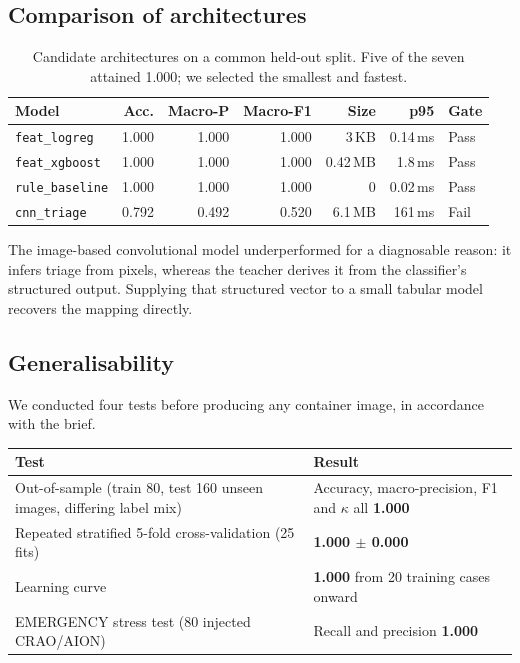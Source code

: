 \documentclass[11pt,a4paper]{article}
\newcommand{\code}[1]{\texttt{\small #1}}
\begin{document}
\subsection{Comparison of architectures}

\begin{table}[H]
\caption{Candidate architectures on a common held-out split. Five of the seven
attained 1.000; we selected the smallest and fastest.}
\begin{tabularx}{\textwidth}{@{}Yrrrrrl@{}}
\toprule
\textbf{Model} & \textbf{Acc.} & \textbf{Macro-P} & \textbf{Macro-F1} &
\textbf{Size} & \textbf{p95} & \textbf{Gate} \\
\midrule
{}
\code{feat\_logreg}   & 1.000 & 1.000 & 1.000 & 3\,KB    & 0.14\,ms & Pass \\
\code{feat\_xgboost}  & 1.000 & 1.000 & 1.000 & 0.42\,MB & 1.8\,ms  & Pass \\
\code{rule\_baseline} & 1.000 & 1.000 & 1.000 & 0        & 0.02\,ms & Pass \\
\code{cnn\_triage}    & 0.792 & \textcolor{stopRed}{0.492} &
\textcolor{stopRed}{0.520} & 6.1\,MB & 161\,ms & \textcolor{stopRed}{Fail} \\
\bottomrule
\end{tabularx}
\end{table}

The image-based convolutional model underperformed for a diagnosable reason: it
infers triage from pixels, whereas the teacher derives it from the classifier's
structured output. Supplying that structured vector to a small tabular model
recovers the mapping directly.

\subsection{Generalisability}

We conducted four tests before producing any container image, in accordance with
the brief.

\begin{table}[H]
\begin{tabularx}{\textwidth}{@{}YL{54mm}@{}}
\toprule
\textbf{Test} & \textbf{Result} \\
\midrule
Out-of-sample (train 80, test 160 unseen images, differing label mix) &
Accuracy, macro-precision, F1 and $\kappa$ all \textbf{1.000} \\
Repeated stratified 5-fold cross-validation (25 fits) & \textbf{1.000 $\pm$ 0.000} \\
Learning curve & \textbf{1.000} from 20 training cases onward \\
EMERGENCY stress test (80 injected CRAO/AION) & Recall and precision \textbf{1.000} \\
\bottomrule
\end{tabularx}
\end{table}
\end{document}
